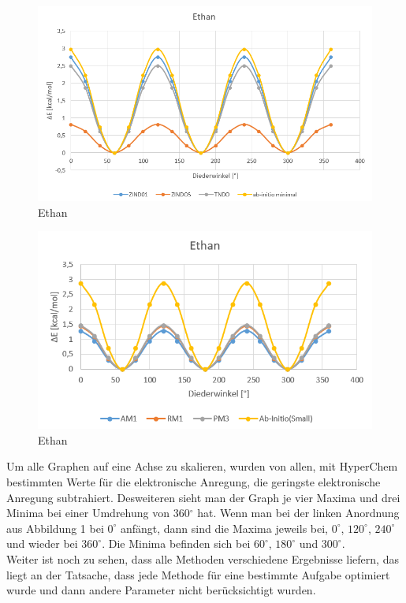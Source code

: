 \begin{figure}[H]
    \centering
    \includegraphics[scale=.7]{../src/img/ethan1.png}
    \caption{Ethan}
\end{figure}

\begin{figure}[H]
    \centering
    \includegraphics[scale=.9]{../src/img/ethan2.png}
    \caption{Ethan}
\end{figure}

Um alle Graphen auf eine Achse zu skalieren, wurden von allen, mit HyperChem bestimmten Werte für die elektronische Anregung, die geringste
elektronische Anregung subtrahiert. Desweiteren sieht man der Graph je vier Maxima und drei Minima bei einer Umdrehung von 360$^\circ$ hat.
Wenn man bei der linken Anordnung aus Abbildung 1 bei $0^\circ$ anfängt, dann sind die Maxima jeweils bei, $0^\circ$, $120^\circ$, $240^\circ$
und wieder bei $360^\circ$. Die Minima befinden sich bei $60^\circ$, $180^\circ$ und $300^\circ$.\\
Weiter ist noch zu sehen, dass alle Methoden verschiedene Ergebnisse liefern, das liegt an der Tatsache, dass jede Methode für eine bestimmte
Aufgabe optimiert wurde und dann andere Parameter nicht berücksichtigt wurden.

